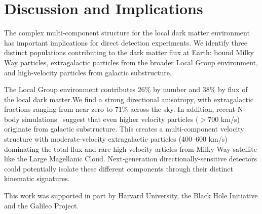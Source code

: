 \documentclass[%
 reprint,
 amsmath,amssymb,
 aps,
]{revtex4-2}
\begin{document}
\section{Discussion and Implications}

The complex multi-component structure for the local dark matter environment has important implications for direct detection experiments. We identify three distinct populations contributing to the dark matter flux at Earth: bound Milky Way particles, extragalactic particles from the broader Local Group environment, and high-velocity particles from galactic substructure.

The Local Group environment contributes 26\% by number and 38\% by flux of the local dark matter.We find a strong directional anisotropy, with extragalactic fractions ranging from near zero to 71\% across the sky. In addition, recent N-body simulations~\cite{DeBrae2025} suggest that even higher velocity particles ($>700$ km/s) originate from galactic substructure. This creates a multi-component velocity structure with moderate-velocity extragalactic particles (400--600 km/s) dominating the total flux and rare high-velocity articles from Milky-Way satellite like the Large Magellanic Cloud. Next-generation directionally-sensitive detectors could potentially isolate these different components through their distinct kinematic signatures.

\acknowledgements This work was supported in part by Harvard University, the Black Hole Initiative and the Galileo Project.




\end{document}
